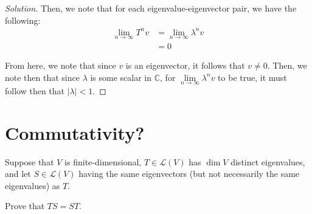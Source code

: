 \documentclass{article}
\newenvironment{solution}{\begin{proof}[Solution]}{\end{proof}}
\newcommand{\CC}{\mathbb{C}}
\begin{document}
\begin{solution}
		Then, we note that for each eigenvalue-eigenvector pair, we have the following:
		\begin{align*}
			\lim\limits_{n \rightarrow \infty} T^{n}v &= \lim\limits_{n \rightarrow \infty} \lambda^{n}v \\
			&= 0
		\end{align*}
	
		From here, we note that since $v$ is an eigenvector, it follows that $v \neq 0$. Then, we note then that since $\lambda$ is some scalar in $\CC$, for $\lim\limits_{n \rightarrow \infty} \lambda^{n} v$ to be true, it must follow then that $\lvert \lambda \rvert < 1$.
	\end{solution}

	\newpage
	 
	\section{Commutativity?}
	\begin{hw}
		Suppose that $V$ is finite-dimensional, $T \in \mathcal L(V)$ has $\dim V $ distinct eigenvalues, and let $S \in \mathcal L(V)$ having the same eigenvectors (but not necessarily the same eigenvalues) as $T$.
		
		Prove that $TS = ST$.
	\end{hw}
\end{document}
